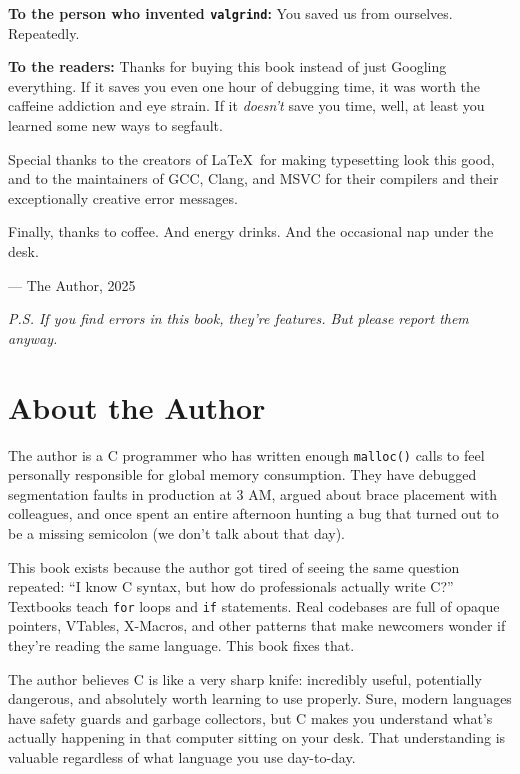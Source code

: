\documentclass[10pt,openany]{book}
\begin{document}
\textbf{To the person who invented \texttt{valgrind}:} You saved us from ourselves. Repeatedly.

\textbf{To the readers:} Thanks for buying this book instead of just Googling everything. If it saves you even one hour of debugging time, it was worth the caffeine addiction and eye strain. If it \textit{doesn't} save you time, well, at least you learned some new ways to segfault.

\vspace{1em}

Special thanks to the creators of \LaTeX\ for making typesetting look this good, and to the maintainers of GCC, Clang, and MSVC for their compilers and their exceptionally creative error messages.

Finally, thanks to coffee. And energy drinks. And the occasional nap under the desk.

\vspace{2em}

— The Author, 2025

\textit{P.S. If you find errors in this book, they're features. But please report them anyway.}

\clearpage

\chapter*{About the Author}

The author is a C programmer who has written enough \texttt{malloc()} calls to feel personally responsible for global memory consumption. They have debugged segmentation faults in production at 3 AM, argued about brace placement with colleagues, and once spent an entire afternoon hunting a bug that turned out to be a missing semicolon (we don't talk about that day).

This book exists because the author got tired of seeing the same question repeated: ``I know C syntax, but how do professionals actually write C?'' Textbooks teach \texttt{for} loops and \texttt{if} statements. Real codebases are full of opaque pointers, VTables, X-Macros, and other patterns that make newcomers wonder if they're reading the same language. This book fixes that.

The author believes C is like a very sharp knife: incredibly useful, potentially dangerous, and absolutely worth learning to use properly. Sure, modern languages have safety guards and garbage collectors, but C makes you understand what's actually happening in that computer sitting on your desk. That understanding is valuable regardless of what language you use day-to-day.
\end{document}
